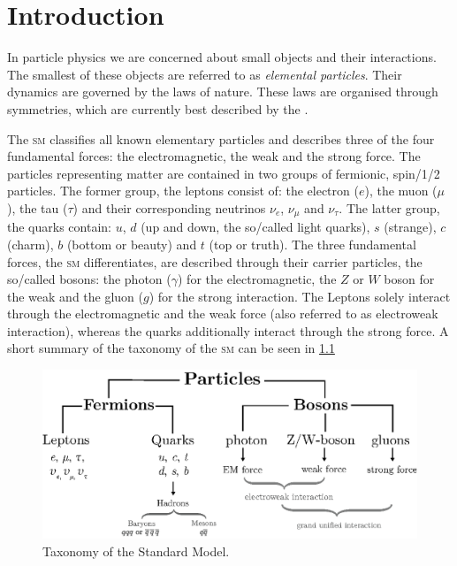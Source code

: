 \documentclass[../../index.tex]{subfiles}
\begin{document}
\chapter{Introduction}
In particle physics we are concerned about small objects and their interactions.
The smallest of these objects are referred to as \textit{elemental particles}.
Their dynamics are governed by the laws of nature. These laws are organised
through symmetries, which are currently best described by the
.

The \textsc{sm} classifies all known elementary particles and describes three of
the four fundamental forces: the electromagnetic, the weak and the strong force.
The particles representing matter are contained in two groups of fermionic,
spin\-/1/2 particles. The former group, the leptons consist of: the electron
(\(e\)), the muon (\(\mu\)), the tau (\(\tau\)) and their corresponding
neutrinos \(\nu_e\), \(\nu_\mu\) and \(\nu_\tau\). The latter group, the quarks
contain: \(u\), \(d\) (up and down, the so\-/called light quarks), \(s\)
(strange), \(c\) (charm), \(b\) (bottom or beauty) and \(t\) (top or truth). The
three fundamental forces, the \textsc{sm} differentiates, are described through
their carrier particles, the so\-/called bosons: the photon (\(\gamma\)) for the
electromagnetic, the \(Z\) or \(W\) boson for the weak and the gluon (\(g\)) for
the strong interaction. The Leptons solely interact through the electromagnetic
and the weak force (also referred to as electroweak interaction), whereas the
quarks additionally interact through the strong force. A short summary of the
taxonomy of the \textsc{sm} can be seen in \cref{fig:SMTaxonomy}
\begin{figure}
  \centering
  \includegraphics[width=\textwidth]{./images/standardModelTaxonomy.eps}
  \caption{Taxonomy of the Standard Model.}
  \label{fig:SMTaxonomy}
\end{figure}
\end{document}
